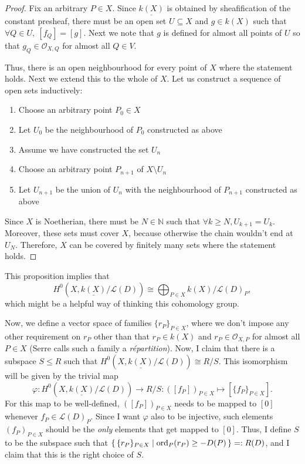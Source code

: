 \documentclass[12pt]{article}
\DeclareMathOperator{\ord}{ord}
\begin{document}
\begin{proof}
  Fix an arbitrary $P\in X$. Since $\underline{k(X)}$ is obtained by
  sheafification of the constant presheaf, there must be an open
  set $U\subseteq X$ and $g\in k(X)$ such that
  $\forall Q\in U,\ [f_{Q}]=[g]$. Next we note that $g$
  is defined for almost all points of $U$ so that $g_{Q}
  \in\mathscr{O}_{X,Q}$ for almost all $Q\in V$.

  Thus, there is an open neighbourhood for every point
  of $X$ where the statement holds. Next we extend this to the whole of $X$.
  Let us construct a sequence of open sets inductively:
  \begin{enumerate}
    \item Choose an arbitrary point $P_{0}\in X$
    \item Let $U_{0}$ be the neighbourhood of $P_{0}$ constructed as above
    \item Assume we have constructed the set $U_{n}$
    \item Choose an arbitrary point $P_{n+1}$ of $X\setminus U_{n}$
    \item Let $U_{n+1}$ be the union of $U_{n}$ with the
          neighbourhood of $P_{n+1}$ constructed as above
  \end{enumerate}
  Since $X$ is Noetherian, there must be $N\in\mathbb{N}$
  such that $\forall k\geq N, U_{k+1}=U_{k}$. Moreover, these sets must
  cover $X$, because otherwise the chain wouldn't end at $U_{N}$.
  Therefore, $X$ can be covered by finitely many sets where the statement
  holds.
\end{proof}
\begin{rem}
  This proposition implies that
  \[
    H^{0}(X,\underline{k(X)}/\mathcal{L}(D))\cong \bigoplus_{P\in X}
    k(X)/\mathcal{L}(D)_{P},
  \]
  which might be a helpful way of thinking this cohomology group.
\end{rem}
Now, we define a vector space of families $\{r_{P}\}_{P\in X}$, where we don't
impose any other requirement on $r_{P}$ other than that $r_{P}\in k(X)$ and
$r_{P}\in\mathscr{O}_{X,P}$ for almost all $P\in X$ (Serre calls such a
family a \emph{r\'epartition}).
Now, I claim that there is a subspace
$S\leq R$ such that $H^{0}(X,\underline{k(X)}/\mathcal{L}(D))\cong R/S$.
This isomorphism will be given by the trivial map
\[
  \varphi: H^{0}(X,\underline{k(X)}/\mathcal{L}(D))\to R/S
  :([f_{P}])_{P\in X}\mapsto [\{f_{P}\}_{P\in X}].
\]
For this map to be well-defined, $([f_{P}])_{P\in X}$ needs to be
mapped to $[0]$ whenever $f_{P}\in\mathcal{L}(D)_{P}$. Since I want
$\varphi$ also to be injective, such elements $(f_{P})_{P\in X}$ should be
the \emph{only} elements that get mapped to $[0]$. Thus, I define $S$
to be the subspace such that $\set{\{r_{P}\}_{P\in X}\mid \ord_{P}(r_{P})
  \geq -D(P)}=:R(D)$, and I claim that this is the right choice of $S$.
\end{document}
